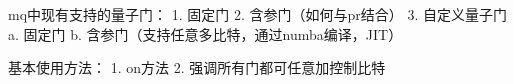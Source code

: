 mq中现有支持的量子门：
1. 固定门
2. 含参门（如何与pr结合）
3. 自定义量子门
  a. 固定门
  b. 含参门（支持任意多比特，通过numba编译，JIT）

基本使用方法：
1. on方法
2. 强调所有门都可任意加控制比特